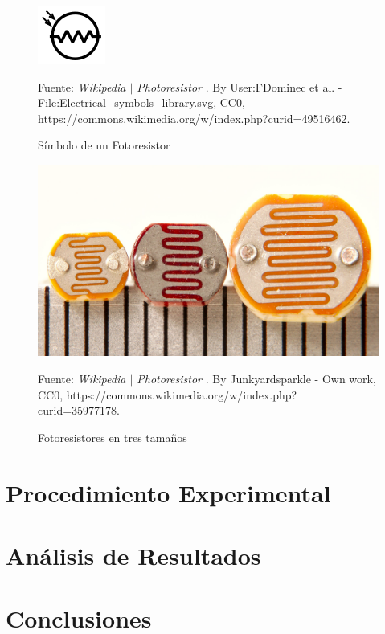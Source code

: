 \documentclass{article}
\begin{document}
\begin{figure}[H]
\centering
\includegraphics[width=0.2\paperwidth]{images/ldr-symbol.png}
\caption{Símbolo de un Fotoresistor}\footnotesize
Fuente: \textit{Wikipedia $\mid$ Photoresistor} \cite{wikipedia-ldr-2022}. By User:FDominec et al. - File:Electrical\_symbols\_library.svg, CC0, https://commons.wikimedia.org/w/index.php?curid=49516462.
\end{figure}

\begin{figure}[H]
\centering
\includegraphics[width=0.2\paperwidth]{images/ldr-three-sizes.jpg}
\caption{Fotoresistores en tres tamaños}\footnotesize
Fuente: \textit{Wikipedia $\mid$ Photoresistor} \cite{wikipedia-ldr-2022}. By Junkyardsparkle - Own work, CC0, https://commons.wikimedia.org/w/index.php?curid=35977178.
\end{figure}

\section{Procedimiento Experimental}


\section{Análisis de Resultados}



\section{Conclusiones}



\printbibliography
\end{document}
